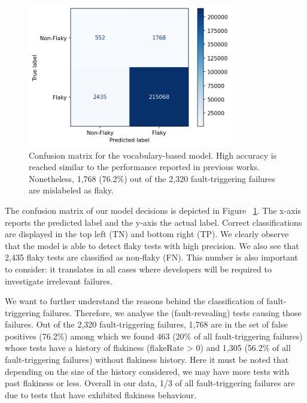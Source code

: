 \begin{figure}[!htbp]
\centering
\vspace{-1.2em}
\includegraphics[width=0.8\textwidth]{figures/chromium/rq1.png}
\vspace{-1.3em}
\caption{Confusion matrix for the vocabulary-based model. High accuracy is reached similar to the performance reported in previous works. Nonetheless, 1,768 (76.2\%) out of the 2,320 fault-triggering failures are mislabeled as flaky.}
\label{fig:confMatrix}
\end{figure}


The confusion matrix of our model decisions is depicted in Figure ~\ref{fig:confMatrix}. The x-axis reports the predicted label and the y-axis the actual label. Correct classifications are displayed in the top left (TN) and bottom right (TP). We clearly observe that the model is able to detect flaky tests with high precision. We also see that 2,435 flaky tests are classified as non-flaky (FN). This number is also important to consider: it translates in all cases where developers will be required to investigate irrelevant failures.

We want to further understand the reasons behind the classification of fault-triggering failures. Therefore, we analyse the (fault-revealing) tests causing those failures. Out of the 2,320 fault-triggering failures, 1,768 are in the set of false positives (76.2\%) among which we found 463 (20\% of all fault-triggering failures) whose tests have a history of flakiness (flakeRate > 0) and 1,305 (56.2\% of all fault-triggering failures) without flakiness history. Here it must be noted that depending on the size of the history considered, we may have more tests with past flakiness or less. Overall in our data, 1/3 of all fault-triggering failures are due to tests that have exhibited flakiness behaviour. 


